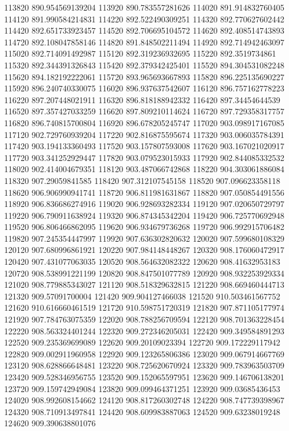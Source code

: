 {113820 890.954569139204
113920 890.783557281626
114020 891.914832760405
114120 891.990584214831
114220 892.522490309251
114320 892.770627602442
114420 892.651733923457
114520 892.706695104572
114620 892.408514743893
114720 892.108047858146
114820 891.848502211494
114920 892.714942463097
115020 892.714091492987
115120 892.319236932695
115220 892.3519734861
115320 892.344391326843
115420 892.379342425401
115520 894.304531082248
115620 894.182192222061
115720 893.965693667893
115820 896.225135690227
115920 896.240740330075
116020 896.937637542607
116120 896.757162778223
116220 897.207448021911
116320 896.818188942332
116420 897.34454644539
116520 897.357427033259
116620 897.809210114624
116720 897.729358317757
116820 896.740815700804
116920 896.678205245747
117020 903.098917167085
117120 902.729760939204
117220 902.816875595674
117320 903.006035784391
117420 903.194133360493
117520 903.157807593008
117620 903.167021020917
117720 903.341252929447
117820 903.079523015933
117920 902.844085332532
118020 902.414004679351
118120 903.487066742868
118220 904.303061886084
118320 907.29059841585
118420 907.312107545158
118520 907.096623358118
118620 906.906990941741
118720 906.811981631867
118820 907.050854491556
118920 906.836686274916
119020 906.928693282334
119120 907.020650729797
119220 906.790911638924
119320 906.874345342204
119420 906.725770692948
119520 906.806466862095
119620 906.934679736268
119720 906.992915706482
119820 907.245354447997
119920 907.636302820632
120020 907.599680108329
120120 907.680996861921
120220 907.984148448267
120320 908.176060472917
120420 907.431077063035
120520 908.564632082322
120620 908.41632953183
120720 908.538991221199
120820 908.847501077789
120920 908.932253929334
121020 908.779885343027
121120 908.518329632815
121220 908.669460444713
121320 909.57091700004
121420 909.904127466038
121520 910.503461567752
121620 910.616660461519
121720 910.598751720319
121820 907.871105177974
121920 907.784763075359
122020 908.788256709594
122120 908.701363228454
122220 908.563324401244
122320 909.272346205031
122420 909.349584891293
122520 909.235369699089
122620 909.20109023394
122720 909.172229117942
122820 909.002911960958
122920 909.123265806386
123020 909.067914667769
123120 908.628866648481
123220 908.725620670924
123320 909.783963503709
123420 909.528346956755
123520 909.152065597951
123620 909.146706138201
123720 909.159742949084
123820 909.099464371251
123920 909.03685436453
124020 908.992608154662
124120 908.817260302748
124220 908.747739398967
124320 908.710913497841
124420 908.609983887063
124520 909.63238019248
124620 909.390638801076
}
